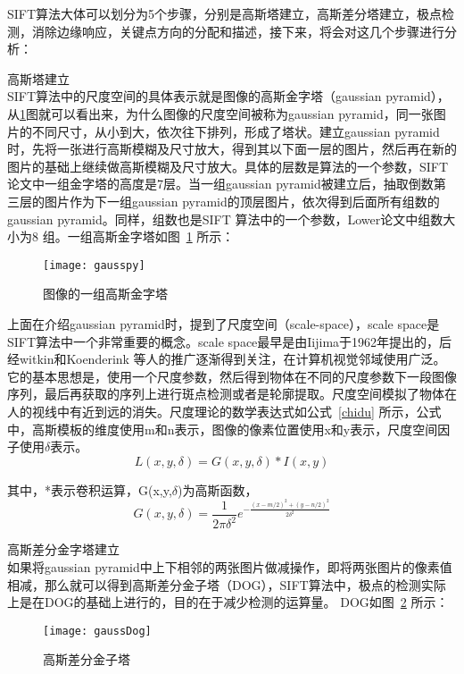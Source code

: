 SIFT算法大体可以划分为5个步骤，分别是高斯塔建立，高斯差分塔建立，极点检测，消除边缘响应，关键点方向的分配和描述，接下来，将会对这几个步骤进行分析：
\begin{compactenum}
\item 高斯塔建立\\SIFT算法中的尺度空间的具体表示就是图像的高斯金字塔（gaussian pyramid），从\ref{fig:gausspy}图就可以看出来，为什么图像的尺度空间被称为gaussian pyramid，同一张图片的不同尺寸，从小到大，依次往下排列，形成了塔状。建立gaussian pyramid时，先将一张进行高斯模糊及尺寸放大，得到其以下面一层的图片，然后再在新的图片的基础上继续做高斯模糊及尺寸放大。具体的层数是算法的一个参数，SIFT论文中一组金字塔的高度是7层。当一组gaussian pyramid被建立后，抽取倒数第三层的图片作为下一组gaussian pyramid的顶层图片，依次得到后面所有组数的gaussian pyramid。同样，组数也是SIFT 算法中的一个参数，Lower论文中组数大小为8 组。一组高斯金字塔如图~\ref{fig:gausspy} 所示：
\begin{figure}[htp]
\centering
\texttt{[image: gausspy]}
\caption{图像的一组高斯金字塔}
\label{fig:gausspy}
\end{figure}

上面在介绍gaussian pyramid时，提到了尺度空间（scale-space），scale space是SIFT算法中一个非常重要的概念。scale space最早是由Iijima于1962年提出的，后经witkin和Koenderink 等人的推广逐渐得到关注，在计算机视觉邻域使用广泛。它的基本思想是，使用一个尺度参数，然后得到物体在不同的尺度参数下一段图像序列，最后再获取的序列上进行斑点检测或者是轮廓提取。尺度空间模拟了物体在人的视线中有近到远的消失。尺度理论的数学表达式如公式~\ref{chidu} 所示，公式中，高斯模板的维度使用m和n表示，图像的像素位置使用x和y表示，尺度空间因子使用$\delta$表示。
\begin{equation}\label{chidu}
L(x,y,\delta)=G(x,y,\delta)*I(x,y)
\end{equation}

其中，*表示卷积运算，G(x,y,$\delta$)为高斯函数，
\begin{equation}\label{gauss}
G(x,y,\delta)=\frac{1}{2\pi{\delta}^2}e^{-\frac{(x-m/2)^2+(y-n/2)^2}{2\delta^2}}
\end{equation}

\item 高斯差分金字塔建立\\如果将gaussian pyramid中上下相邻的两张图片做减操作，即将两张图片的像素值相减，那么就可以得到高斯差分金子塔（DOG），SIFT算法中，极点的检测实际上是在DOG的基础上进行的，目的在于减少检测的运算量。 DOG如图~\ref{fig:gaussDog} 所示：
\begin{figure}[htp]
\centering
\texttt{[image: gaussDog]}
\caption{高斯差分金子塔}
\label{fig:gaussDog}
\end{figure}


\end{compactenum}
